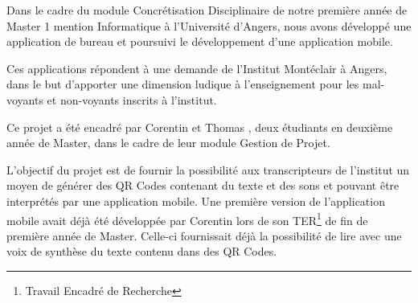 
\par
Dans le cadre du module Concrétisation Disciplinaire de notre première année de Master 1 mention Informatique à l'Université d'Angers, nous avons développé une application de bureau et poursuivi le développement d'une application mobile.

\par
Ces applications répondent à une demande de l'Institut Montéclair à Angers, dans le but d'apporter une dimension ludique à l'enseignement pour les mal-voyants et non-voyants inscrits à l'institut.

\par
Ce projet a été encadré par Corentin  et Thomas , deux étudiants en deuxième année de Master, dans le cadre de leur module Gestion de Projet.\\

\par
L'objectif du projet est de fournir la possibilité aux transcripteurs de l'institut un moyen de générer des QR Codes contenant du texte et des sons et pouvant être interprétés par une application mobile. Une première version de l'application mobile avait déjà été développée par Corentin  lors de son TER\footnote{Travail Encadré de Recherche} de fin de première année de Master. Celle-ci fournissait déjà la possibilité de lire avec une voix de synthèse du texte contenu dans des QR Codes.\\

